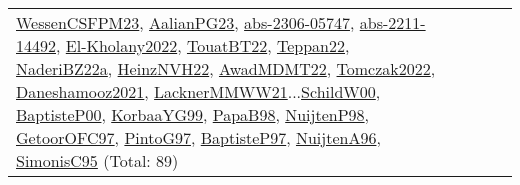 {\begin{longtable}{p{3cm}r>{\raggedright\arraybackslash}p{6cm}>{\raggedright\arraybackslash}p{6cm}>{\raggedright\arraybackslash}p{8cm}}
\hyperref[detail:WessenCSFPM23]{WessenCSFPM23}, \hyperref[detail:AalianPG23]{AalianPG23}, \hyperref[detail:abs-2306-05747]{abs-2306-05747}, \hyperref[detail:abs-2211-14492]{abs-2211-14492}, \hyperref[detail:El-Kholany2022]{El-Kholany2022}, \hyperref[detail:TouatBT22]{TouatBT22}, \hyperref[detail:Teppan22]{Teppan22}, \hyperref[detail:NaderiBZ22a]{NaderiBZ22a}, \hyperref[detail:HeinzNVH22]{HeinzNVH22}, \hyperref[detail:AwadMDMT22]{AwadMDMT22}, \hyperref[detail:Tomczak2022]{Tomczak2022}, \hyperref[detail:Daneshamooz2021]{Daneshamooz2021}, \hyperref[detail:LacknerMMWW21]{LacknerMMWW21}...\hyperref[detail:SchildW00]{SchildW00}, \hyperref[detail:BaptisteP00]{BaptisteP00}, \hyperref[detail:KorbaaYG99]{KorbaaYG99}, \hyperref[detail:PapaB98]{PapaB98}, \hyperref[detail:NuijtenP98]{NuijtenP98}, \hyperref[detail:GetoorOFC97]{GetoorOFC97}, \hyperref[detail:PintoG97]{PintoG97}, \hyperref[detail:BaptisteP97]{BaptisteP97}, \hyperref[detail:NuijtenA96]{NuijtenA96}, \hyperref[detail:SimonisC95]{SimonisC95} (Total: 89)\\

\end{longtable}}
